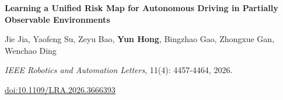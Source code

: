 {\cvsmall
\textbf{Learning a Unified Risk Map for Autonomous Driving in Partially Observable Environments}\par
Jie Jia, Yaofeng Su, Zeyu Bao, \textbf{Yun Hong}, Bingzhao Gao, Zhongxue Gan, Wenchao Ding\par
\textit{IEEE Robotics and Automation Letters}, 11(4): 4457-4464, 2026.\par
\href{https://doi.org/10.1109/LRA.2026.3666393}{doi:10.1109/LRA.2026.3666393}\par}
